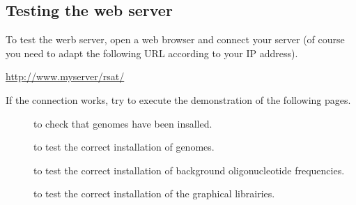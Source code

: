 \documentclass[12pt,a4paper, twoside]{scrreprt} %
\begin{document}






\subsection{Testing the web server}

To test the werb server, open a web browser and connect your \RSAT
server (of course you need to adapt the following URL according to
your IP address).

\url{http://www.myserver/rsat/} 

If the connection works, try to execute the demonstration of the
following pages.

\begin{description}
\item[] to check that genomes have
  been insalled.
  
\item[] to test the correct installation of
  genomes.

\item[] to test the correct installation of
  background oligonucleotide frequencies.

\item[] to test the correct installation of the
  graphical librairies.
\end{description}
\end{document}
